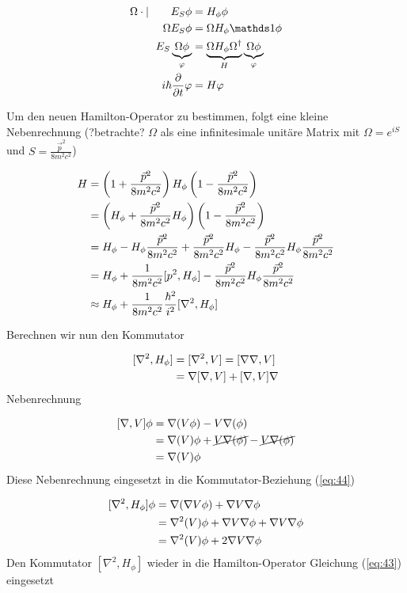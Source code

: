 \begin{align}
  \label{eq:41}
  \Omega\cdot|\qquad E_S \phi &= H_\phi \phi \notag\\
\Omega E_S \phi &= \Omega H_\phi \mathds 1 \phi \notag\\
E_S  \underbr{\Omega  \phi}_{\varphi} &= \underbr{\Omega H_\phi \Omega^\dagger}_{H} \underbr{\Omega  \phi}_{\varphi} \notag\\
i\hbar\pdiff_t \varphi &= H\varphi
\end{align}

Um den neuen Hamilton-Operator zu bestimmen, folgt eine kleine Nebenrechnung (?betrachte? \(\Omega\) als eine infinitesimale unitäre Matrix mit \(\Omega=e^{iS}\) und \(S=\frac{\vec p^2}{8m^2c^2}\))

\begin{align}
  \label{eq:43}
  H &= \left(1 + \frac{\vec p^2}{8m^2c^2} \right) H_\phi \left(1 - \frac{\vec p^2}{8m^2c^2} \right) \notag\\
&= \left(H_\phi + \frac{\vec p^2}{8m^2c^2}H_\phi\right) \left(1 - \frac{\vec p^2}{8m^2c^2} \right) \notag\\
&=H_\phi - H_\phi\frac{\vec p^2}{8m^2c^2}+\frac{\vec p^2}{8m^2c^2}H_\phi-\frac{\vec p^2}{8m^2c^2}H_\phi\frac{\vec p^2}{8m^2c^2}  \notag\\
&=H_\phi + \frac{1}{8m^2c^2}[p^2,H_\phi] -\frac{\vec p^2}{8m^2c^2}H_\phi\frac{\vec p^2}{8m^2c^2}  \notag\\
&\approx H_\phi + \frac{1}{8m^2c^2}\frac{\hbar^2}{i^2}[\nabla^2,H_\phi]
\end{align}

Berechnen wir nun den Kommutator

\begin{align}
  \label{eq:44}
  [\nabla^2,H_\phi] &= [\nabla^2,V] = [\nabla\nabla,V] \notag\\
&=\nabla[\nabla,V]+[\nabla,V]\nabla
\end{align}
Nebenrechnung

\begin{align}
  \label{eq:45}
  [\nabla,V]\phi &= \nabla(V\phi) - V\nabla(\phi)\notag\\ 
&= \nabla(V)\phi + \cancel{V\nabla(\phi)}- \cancel{V\nabla(\phi)}\notag\\ 
&=\nabla(V)\phi 
\end{align}
Diese Nebenrechnung eingesetzt in die Kommutator-Beziehung (\ref{eq:44})

\begin{align}
  \label{eq:46}
  [\nabla^2,H_\phi]\phi &= \nabla(\nabla V\phi)+\nabla V \nabla\phi \notag\\
&= \nabla^2 (V)\phi + \nabla V\nabla\phi +\nabla V \nabla\phi \notag\\
&=\nabla^2 (V)\phi + 2\nabla V\nabla\phi
\end{align}
Den Kommutator \([\nabla^2,H_\phi]\) wieder in die Hamilton-Operator Gleichung (\ref{eq:43}) eingesetzt

